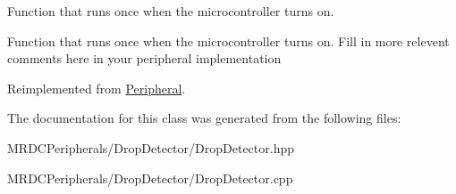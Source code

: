Function that runs once when the microcontroller turns on. 

Function that runs once when the microcontroller turns on. Fill in more relevent comments here in your peripheral implementation 

Reimplemented from \mbox{\hyperlink{class_peripheral_a2ad7fea98c49d0d319bfa17ca4dcff6c}{Peripheral}}.



The documentation for this class was generated from the following files\+:\begin{DoxyCompactItemize}
\item 
M\+R\+D\+C\+Peripherals/\+Drop\+Detector/Drop\+Detector.\+hpp\item 
M\+R\+D\+C\+Peripherals/\+Drop\+Detector/Drop\+Detector.\+cpp\end{DoxyCompactItemize}
